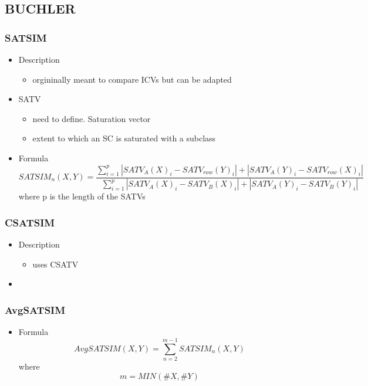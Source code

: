 \documentclass{article}
\begin{document}
\subsection{BUCHLER}
\label{sec-6-9}
\subsubsection{SATSIM}
\label{sec-6-9-1}
\begin{itemize}

\item Description
\label{sec-6-9-1-1}%
\begin{itemize}
\item orgininally meant to compare ICVs but can be adapted
\end{itemize}

\item SATV
\label{sec-6-9-1-2}%
\begin{itemize}
\item need to define. Saturation vector
\item extent to which an SC is saturated with a subclass
\end{itemize}

\item Formula\\
\label{sec-6-9-1-3}%
$$ 
SATSIM_{n}(X,Y)= \frac{\sum_{i=1}^{p}{\left|SATV_{A}(X)_{i}-SATV_{row}(Y)_{i}\right|+\left|SATV_{A}(Y)_{i}-SATV_{row}(X)_{i}\right|}}{\sum_{i=1}^{p}{\left|SATV_{A}(X)_{i}-SATV_{B}(X)_{i}\right|+\left|SATV_{A}(Y)_{i}-SATV_{B}(Y)_{i}\right|}}
$$
where p is the length of the SATVs
\end{itemize} %
\subsubsection{CSATSIM}
\label{sec-6-9-2}
\begin{itemize}

\item Description
\label{sec-6-9-2-1}%
\begin{itemize}
\item uses CSATV
\end{itemize}

\item 
%
\end{itemize} %
\subsubsection{AvgSATSIM}
\label{sec-6-9-3}
\begin{itemize}

\item Formula\\
\label{sec-6-9-3-1}%
$$ AvgSATSIM(X,Y)= \sum_{n=2}^{m-1}{SATSIM_{n}(X,Y)} $$
where $$ m = MIN(\#X,\#Y)  $$
\end{itemize} %
\end{document}
